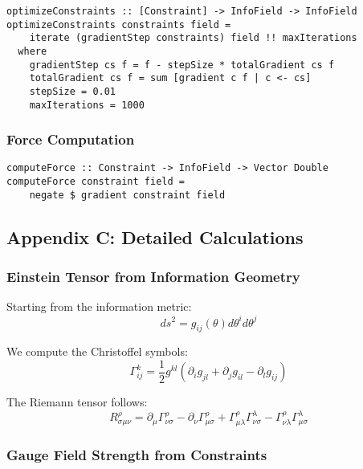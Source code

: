 \documentclass[11pt,a4paper]{article}
\begin{document}
\begin{lstlisting}
optimizeConstraints :: [Constraint] -> InfoField -> InfoField
optimizeConstraints constraints field = 
    iterate (gradientStep constraints) field !! maxIterations
  where
    gradientStep cs f = f - stepSize * totalGradient cs f
    totalGradient cs f = sum [gradient c f | c <- cs]
    stepSize = 0.01
    maxIterations = 1000
\end{lstlisting}

\subsubsection{Force Computation}

\begin{lstlisting}
computeForce :: Constraint -> InfoField -> Vector Double
computeForce constraint field = 
    negate $ gradient constraint field
\end{lstlisting}

\subsection{Appendix C: Detailed Calculations}

\subsubsection{Einstein Tensor from Information Geometry}

Starting from the information metric:
\begin{equation}
ds^2 = g_{ij}(\theta) d\theta^i d\theta^j
\end{equation}

We compute the Christoffel symbols:
\begin{equation}
\Gamma^k_{ij} = \frac{1}{2} g^{kl} \left( \partial_i g_{jl} + \partial_j g_{il} - \partial_l g_{ij} \right)
\end{equation}

The Riemann tensor follows:
\begin{equation}
R^{\rho}_{\sigma\mu\nu} = \partial_{\mu}\Gamma^{\rho}_{\nu\sigma} - \partial_{\nu}\Gamma^{\rho}_{\mu\sigma} + \Gamma^{\rho}_{\mu\lambda}\Gamma^{\lambda}_{\nu\sigma} - \Gamma^{\rho}_{\nu\lambda}\Gamma^{\lambda}_{\mu\sigma}
\end{equation}

\subsubsection{Gauge Field Strength from Constraints}
\end{document}
